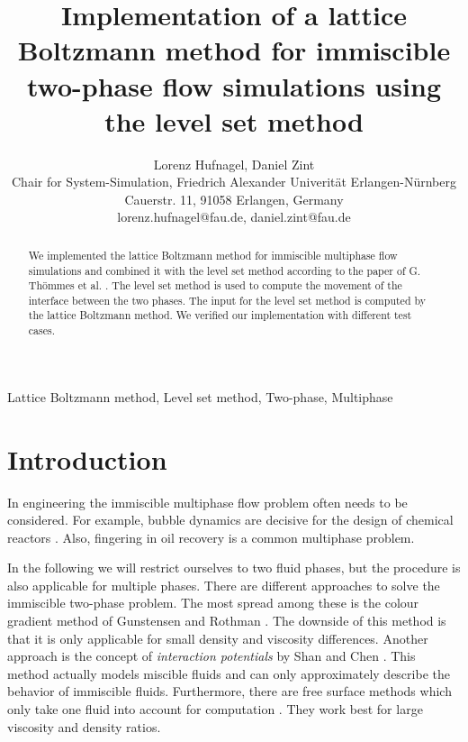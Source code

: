 \documentclass[final,leqno,onefignum,onetabnum]{siamltexmm}
\title{Implementation of a lattice Boltzmann method for immiscible two-phase flow simulations using the level set method}
\author
{Lorenz Hufnagel, Daniel Zint\\
Chair for System-Simulation, Friedrich Alexander Univerit\"at Erlangen-N\"urnberg\\
Cauerstr. 11, 91058 Erlangen, Germany\\
lorenz.hufnagel@fau.de, daniel.zint@fau.de %
}
\begin{document}
\maketitle
\newcommand{\slugmaster}{%
\slugger{}{}{}{}{}}%

\begin{abstract}
	We implemented the lattice Boltzmann method for immiscible multiphase flow simulations and combined it with the level set method according to the paper of G. Th\"ommes et al. \cite{Thoemmes}. The level set method is used to compute the movement of the interface between the two phases. The input for the level set method is computed by the lattice Boltzmann method. We verified our implementation with different test cases.
\end{abstract}

\begin{keywords}
	Lattice Boltzmann method,
	Level set method,
	Two-phase,
	Multiphase
\end{keywords}



\pagestyle{myheadings}
\thispagestyle{plain}

\section{Introduction}
In engineering the immiscible multiphase flow problem often needs to be considered. For example, bubble dynamics are decisive for the design of chemical reactors \cite{trygg}. Also, fingering in oil recovery is a common multiphase problem.

In the following we will restrict ourselves to two fluid phases, but the procedure is also applicable for multiple phases. 
There are different approaches to solve the immiscible two-phase problem. The most spread among these is the colour gradient method of Gunstensen and Rothman \cite{GRcg1,GRcg2,GRcg3}. The downside of this method is that it is only applicable for small density and viscosity differences. Another approach is the concept of {\it interaction potentials} by Shan and Chen \cite{ShanChen1,ShanChen2}. This method actually models miscible fluids and can only approximately describe the behavior of immiscible fluids. Furthermore, there are free surface methods which only take one fluid into account for computation \cite{Koerner,Scardovelli,Hirt}. They work best for large viscosity and density ratios.
\end{document}
